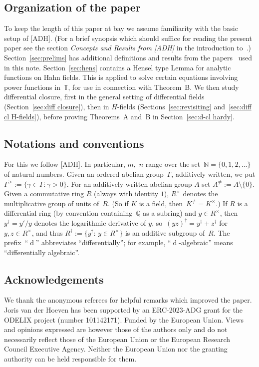 \documentclass[]{amsart}
\numberwithin{equation}{section}
\newcommand{\bbold}{\mathbb}
\def\Q { {\bbold Q} }
\def\N { {\bbold N} }
\def\T { {\bbold T} }
\def \d{\operatorname{d}}
\theoremstyle{definition}
\theoremstyle{remark}
\begin{document}
\subsection*{Organization of the paper} 
To keep the length of this paper at bay we assume familiarity with the basic setup of [ADH]. (For a brief synopsis which should suffice for reading the present paper see the section {\it Concepts and Results from \textup{[ADH]}}\/ in the introduction to~\cite{ADH4}.) Section~\ref{sec:prelims} has additional definitions and results
from the papers~\cite{ADH5, ADH4,ADH2} used in this note.
Section~\ref{sec:hens} contains a Hensel type Lemma for analytic functions on Hahn fields. This is
applied to solve  certain equations involving power functions in~$\T$, for use in connection with Theorem~B.
We then study differential closure, first  in the general setting of differential fields (Section~\ref{sec:diff closure}), then in  $H$-fields (Sections~\ref{sec:revisiting} and~\ref{sec:diff cl H-fields}),
before proving Theorems~A and~B in Section~\ref{sec:d-cl hardy}.

\subsection*{Notations and conventions} 
For this we follow [ADH]. In particular,  $m$,~$n$   range over the set~$\N=\{0,1,2,\dots\}$ of natural numbers. 
  Given an ordered abelian group~$\Gamma$, additively written, we put $\Gamma^>:=\{\gamma\in\Gamma:\gamma>0\}$.
For an additively written abelian group $A$   set $A^{\ne}:=A\setminus\{0\}$. Given a commutative ring $R$ (always with identity $1$), 
$R^\times$ denotes the multiplicative group of units of~$R$. (So if $K$ is a field, then~$K^{\neq}=K^\times$.)
If $R$ is a differential ring (by convention containing~$\Q$ as a subring) and $y\in R^\times$, then~$y^\dagger=y'/y$ denotes the logarithmic derivative of $y$, so~$(yz)^\dagger = y^\dagger + z^\dagger$ for $y,z\in R^\times$, and
thus  $R^\dagger:=\{y^\dagger:\, y\in R^\times\}$ is an additive subgroup of~$R$. 
 The prefix~``$\d$'' abbreviates ``differentially''; for example, ``$\d$-algebraic'' means ``differentially algebraic''. 

\subsection*{Acknowledgements}
We thank the anonymous referees for helpful remarks which improved the paper.
Joris van der Hoeven has been supported by an ERC-2023-ADG grant for the
ODELIX project (number 101142171). Funded by the European Union. Views and opinions expressed are however those
of the authors only and do not necessarily reflect those of the European
Union or the European Research Council Executive Agency. Neither the European
Union nor the granting authority can be held responsible for them.
\end{document}
